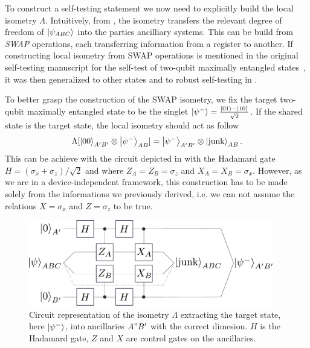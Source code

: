 \medbreak

To construct a self-testing statement we now need to explicitly build the local isometry $\Lambda$. 
Intuitively, from , the isometry transfers the relevant degree of freedom of $\ket{\psi_{ABC}}$ into the parties ancilliary systems.
This can be build from \textit{SWAP} operations, each transferring information from a register to another.
If constructing local isometry from SWAP operations is mentioned in the original self-testing manuscript for the self-test of two-qubit maximally entangled states~\cite{Mayers2004}, it was then generalized to other states and to robust self-testing in \cite{McKague2012,Yang2013,Yang2014,Bancal15}. 

To better grasp the construction of the SWAP isometry, we fix the target two-qubit maximally entangled state to be the singlet $\ket{\psi^-}=\frac{\ket{01}-\ket{10}}{\sqrt{2}}$.
If the shared state is the target state, the local isometry should act as follow
\begin{equation}
	\Lambda[\ket{00}_{A'B'} \otimes \ket{\psi^-}_{AB}] = \ket{\psi^-}_{A'B'} \otimes \ket{\text{junk}}_{AB}.
\end{equation}
This can be achieve with the circuit depicted in  with the Hadamard gate $H=(\sigma_x+\sigma_z)/\sqrt{2}$ and where $Z_A=Z_B=\sigma_z$ and $X_A=X_B=\sigma_x$.
However, as we are in a device-independent framework, this construction has to be made solely from the informations we previously derived, i.e. we can not assume the relations $X=\sigma_x$ and $Z=\sigma_z$ to be true.

\begin{figure}
	\begin{center}
		\includegraphics[width=0.95\textwidth]{chapters/selftesting/img/swap.pdf}
	\end{center}
	\caption{Circuit representation of the isometry $\Lambda$ extracting the target state, here $\ket{\psi^-}$, into ancillaries $A"B'$ with the correct dimesion. $H$ is the Hadamard gate, $Z$ and $X$ are control gates on the ancillaries.}
	\label{fig:swap}
\end{figure}

